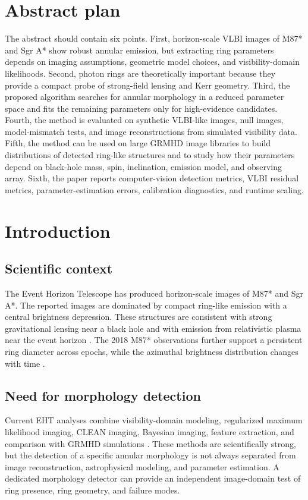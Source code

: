 \documentclass[11pt]{article}
\begin{document}
\section{Abstract plan}

The abstract should contain six points. First, horizon-scale VLBI images of M87* and Sgr A* show robust annular emission, but extracting ring parameters depends on imaging assumptions, geometric model choices, and visibility-domain likelihoods. Second, photon rings are theoretically important because they provide a compact probe of strong-field lensing and Kerr geometry. Third, the proposed algorithm searches for annular morphology in a reduced parameter space and fits the remaining parameters only for high-evidence candidates. Fourth, the method is evaluated on synthetic VLBI-like images, null images, model-mismatch tests, and image reconstructions from simulated visibility data. Fifth, the method can be used on large GRMHD image libraries to build distributions of detected ring-like structures and to study how their parameters depend on black-hole mass, spin, inclination, emission model, and observing array. Sixth, the paper reports computer-vision detection metrics, VLBI residual metrics, parameter-estimation errors, calibration diagnostics, and runtime scaling.

\section{Introduction}

\subsection{Scientific context}
The Event Horizon Telescope has produced horizon-scale images of M87* and Sgr A*. The reported images are dominated by compact ring-like emission with a central brightness depression. These structures are consistent with strong gravitational lensing near a black hole and with emission from relativistic plasma near the event horizon \citep{EHTM87I2019,EHTM87IV2019,EHTSgrAI2022,EHTSgrAIII2022}. The 2018 M87* observations further support a persistent ring diameter across epochs, while the azimuthal brightness distribution changes with time \citep{EHTM87Persistent2024}.

\subsection{Need for morphology detection}
Current EHT analyses combine visibility-domain modeling, regularized maximum likelihood imaging, CLEAN imaging, Bayesian imaging, feature extraction, and comparison with GRMHD simulations \citep{EHTM87IV2019,EHTM87VI2019,EHTSgrAIV2022}. These methods are scientifically strong, but the detection of a specific annular morphology is not always separated from image reconstruction, astrophysical modeling, and parameter estimation. A dedicated morphology detector can provide an independent image-domain test of ring presence, ring geometry, and failure modes.
\end{document}
